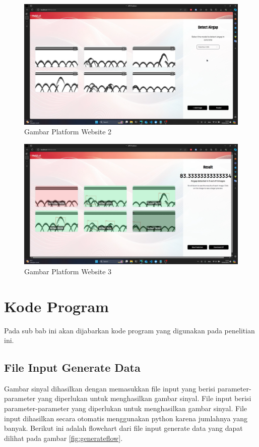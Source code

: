 \begin{minipage}{\linewidth}
  \begin{figure} [H] \centering
    \includegraphics[scale=0.15]{gambar/bab3/web2.png}
    \caption{Gambar Platform Website 2}
  \end{figure}
\end{minipage}

\begin{minipage}{\linewidth}
  \begin{figure} [H] \centering
    \includegraphics[scale=0.15]{gambar/bab3/web3.png}
    \caption{Gambar Platform Website 3}
  \end{figure}
\end{minipage}

\section{Kode Program}
Pada sub bab ini akan dijabarkan kode program yang digunakan pada penelitian ini.

\subsection{File Input Generate Data}
Gambar sinyal dihasilkan dengan memasukkan file input yang berisi parameter-parameter yang diperlukan untuk menghasilkan gambar sinyal. File input berisi parameter-parameter yang diperlukan untuk menghasilkan gambar sinyal. File input dihasilkan secara otomatis menggunakan python karena jumlahnya yang banyak. Berikut ini adalah flowchart dari file input generate data yang dapat dilihat pada gambar \ref{fig:generateflow}.

